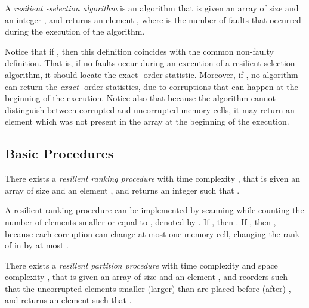 \documentclass{llncs}
\begin{document}
\begin{definition}
\label{def:resilient-selection-algorithm}
A \emph{resilient -selection algorithm} is an algorithm that is given an array  of size  and an integer , and returns an element , where  is the number of faults that occurred during the execution of the algorithm.~\end{definition}

Notice that if , then this definition coincides with the common non-faulty definition. That is, if no faults occur during an execution of a resilient selection algorithm, it should locate the exact -order statistic.
Moreover, if , no algorithm can return the \emph{exact} -order statistics, due to corruptions that can happen at the beginning of the execution.
Notice also that because the algorithm cannot distinguish between corrupted and uncorrupted memory cells, it may return an element which was not present in the array at the beginning of the execution.


















\subsection{Basic Procedures}

\begin{lemma}
\label{def:ranking-procedure}
There exists a \emph{resilient ranking procedure} with time complexity , that is given an array  of size  and an element , and returns an integer  such that .
\end{lemma}

\begin{pf}
A resilient ranking procedure can be implemented by scanning  while counting the number of elements smaller or equal to , denoted by . If , then . If , then , because each corruption can change at most one memory cell, changing the rank of  in  by \linebreak at most .
\end{pf}

\begin{lemma}
\label{resilient_partition_algorithm}
There exists a \emph{resilient partition procedure} with time complexity  and space complexity , that is given an array  of size  and an element , and reorders  such that the uncorrupted elements smaller (larger) than  are placed before (after) , and returns an element  such that .
\end{lemma}
\end{document}
